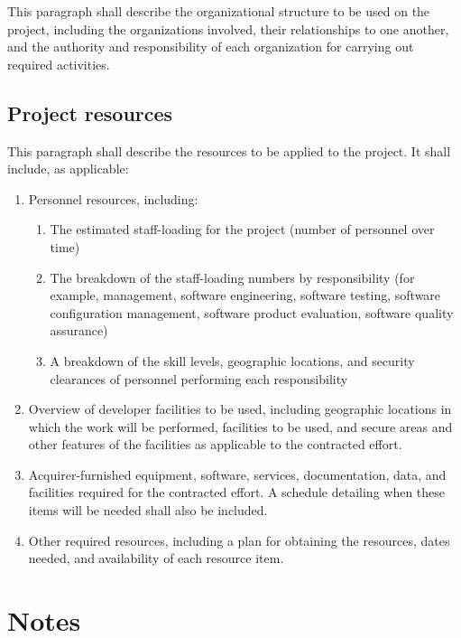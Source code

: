 \documentclass{fidata-report-template}
\begin{document}
This paragraph shall describe the organizational structure to be used on
the project, including the organizations involved, their relationships
to one another, and the authority and responsibility of each
organization for carrying out required activities.

\subsection{Project resources}

This paragraph shall describe the resources to be applied to the
project. It shall include, as applicable:

\begin{enumerate}
\itemsep1pt\parskip0pt
\item
  Personnel resources, including:

  \begin{enumerate}
  \itemsep1pt\parskip0pt
  \item
    The estimated staff-loading for the project (number of personnel
    over time)
  \item
    The breakdown of the staff-loading numbers by responsibility (for
    example, management, software engineering, software testing,
    software configuration management, software product evaluation,
    software quality assurance)
  \item
    A breakdown of the skill levels, geographic locations, and security
    clearances of personnel performing each responsibility
  \end{enumerate}
\item
  Overview of developer facilities to be used, including geographic
  locations in which the work will be performed, facilities to be used,
  and secure areas and other features of the facilities as applicable to
  the contracted effort.
\item
  Acquirer-furnished equipment, software, services, documentation, data,
  and facilities required for the contracted effort. A schedule
  detailing when these items will be needed shall also be included.
\item
  Other required resources, including a plan for obtaining the
  resources, dates needed, and availability of each resource item.
\end{enumerate}

\section{Notes}
\end{document}
